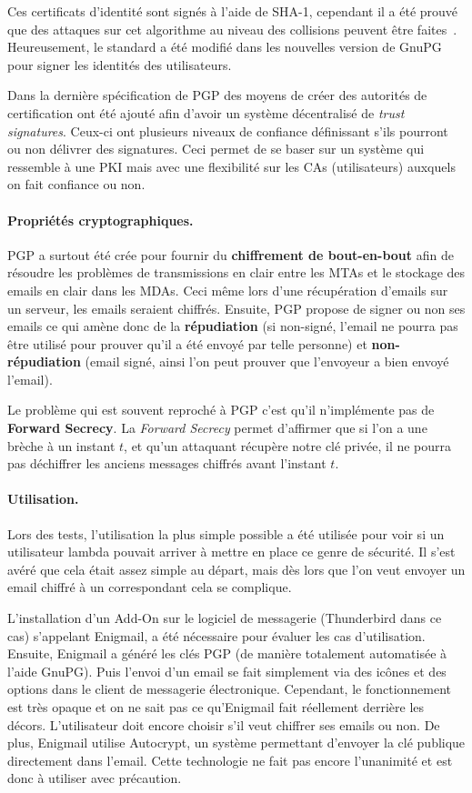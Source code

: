 Ces certificats d'identité sont signés à l'aide de SHA-1, cependant il a été prouvé que des attaques sur cet algorithme au niveau des collisions peuvent être faites~\cite{journals/iacr/LeurentP20}. Heureusement, le standard a été modifié dans les nouvelles version de GnuPG pour signer les identités des utilisateurs.

Dans la dernière spécification de PGP des moyens de créer des autorités de certification ont été ajouté afin d'avoir un système décentralisé de \textit{trust signatures}. Ceux-ci ont plusieurs niveaux de confiance définissant s'ils pourront ou non délivrer des signatures. Ceci permet de se baser sur un système qui ressemble à une PKI mais avec une flexibilité sur les CAs (utilisateurs) auxquels on fait confiance ou non.
\paragraph*{Propriétés cryptographiques.}
PGP a surtout été crée pour fournir du \textbf{chiffrement de bout-en-bout} afin de résoudre les problèmes de transmissions en clair entre les MTAs et le stockage des emails en clair dans les MDAs. Ceci même lors d'une récupération d'emails sur un serveur, les emails seraient chiffrés. Ensuite, PGP propose de signer ou non ses emails ce qui amène donc de la \textbf{répudiation} (si non-signé, l'email ne pourra pas être utilisé pour prouver qu'il a été envoyé par telle personne) et \textbf{non-répudiation} (email signé, ainsi l'on peut prouver que l'envoyeur a bien envoyé l'email).

Le problème qui est souvent reproché à PGP c'est qu'il n'implémente pas de \textbf{Forward Secrecy}. La \textit{Forward Secrecy} permet d'affirmer que si l'on a une brèche à un instant $t$, et qu'un attaquant récupère notre clé privée, il ne pourra pas déchiffrer les anciens messages chiffrés avant l'instant $t$.
\paragraph*{Utilisation.}
Lors des tests, l’utilisation la plus simple possible a été utilisée pour voir si un utilisateur lambda pouvait arriver à mettre en place ce genre de sécurité. Il s’est avéré que cela était assez simple au départ, mais dès lors que l'on veut envoyer un email chiffré à un correspondant cela se complique.

L'installation d'un Add-On sur le logiciel de messagerie (Thunderbird dans ce cas) s’appelant Enigmail, a été nécessaire pour évaluer les cas d'utilisation. Ensuite, Enigmail a généré les clés PGP (de manière totalement automatisée à l'aide GnuPG). Puis l'envoi d'un email se fait simplement via des icônes et des options dans le client de messagerie électronique. Cependant, le fonctionnement est très opaque et on ne sait pas ce qu'Enigmail fait réellement derrière les décors. L’utilisateur doit encore choisir s’il veut chiffrer ses emails ou non. De plus, Enigmail utilise Autocrypt, un système permettant d'envoyer la clé publique directement dans l'email. Cette technologie ne fait pas encore l'unanimité et est donc à utiliser avec précaution.
 
